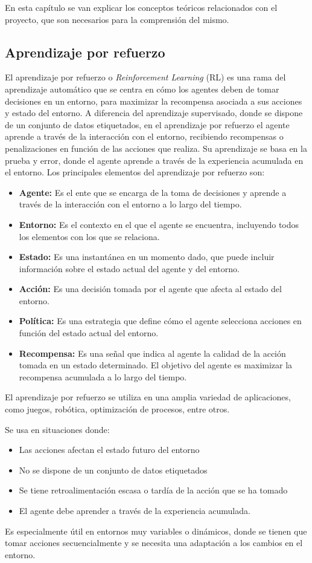 En esta capítulo se van explicar los conceptos teóricos relacionados con el proyecto, que son necesarios para la comprensión del mismo.

\subsection{Aprendizaje por refuerzo}
El aprendizaje por refuerzo o \textit{Reinforcement Learning} (RL) es una rama del aprendizaje automático que se centra en cómo los agentes deben de tomar decisiones en un entorno, para maximizar la recompensa asociada a sus acciones y estado del entorno. A diferencia del aprendizaje supervisado, donde se dispone de un conjunto de datos etiquetados, en el aprendizaje por refuerzo el agente aprende a través de la interacción con el entorno, recibiendo recompensas o penalizaciones en función de las acciones que realiza. Su aprendizaje se basa en la prueba y error, donde el agente aprende a través de la experiencia acumulada en el entorno. 
Los principales elementos del aprendizaje por refuerzo son:
\begin{itemize}
	\item \textbf{Agente:} Es el ente que se encarga de la toma de decisiones y aprende a través de la interacción con el entorno a lo largo del tiempo.
	\item \textbf{Entorno:} Es el contexto en el que el agente se encuentra, incluyendo todos los elementos con los que se relaciona.
	\item \textbf{Estado:} Es una instantánea en un momento dado, que puede incluir información sobre el estado actual del agente y del entorno.
	\item \textbf{Acción:} Es una decisión tomada por el agente que afecta al estado del entorno.
	\item \textbf{Política:} Es una estrategia que define cómo el agente selecciona acciones en función del estado actual del entorno.
	\item \textbf{Recompensa:} Es una señal que indica al agente la calidad de la acción tomada en un estado determinado. El objetivo del agente es maximizar la recompensa acumulada a lo largo del tiempo.
\end{itemize}

El aprendizaje por refuerzo se utiliza en una amplia variedad de aplicaciones, como juegos, robótica, optimización de procesos, entre otros.

Se usa en situaciones donde:
\begin{itemize}
	\item Las acciones afectan el estado futuro del entorno
	\item No se dispone de un conjunto de datos etiquetados
	\item Se tiene retroalimentación escasa o tardía de la acción que se ha tomado
	\item El agente debe aprender a través de la experiencia acumulada.
\end{itemize}
Es especialmente útil en entornos muy variables o dinámicos, donde se tienen que tomar acciones secuencialmente y se necesita una adaptación a los cambios en el entorno.


